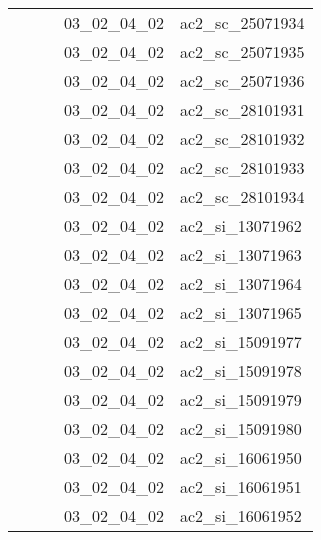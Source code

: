 \documentclass[12pt,titlepage,oneside]{book}
\begin{document}
\begin{supertabular}{|p{7.5cm}|p{7.5cm}|p{7.5cm}|c|p{10cm}|}
                   &                    &                    & 03\_02\_04\_02 & ac2\_sc\_25071934\\
                   &                    &                    & 03\_02\_04\_02 & ac2\_sc\_25071935\\
                   &                    &                    & 03\_02\_04\_02 & ac2\_sc\_25071936\\
                   &                    &                    & 03\_02\_04\_02 & ac2\_sc\_28101931\\
                   &                    &                    & 03\_02\_04\_02 & ac2\_sc\_28101932\\
                   &                    &                    & 03\_02\_04\_02 & ac2\_sc\_28101933\\
                   &                    &                    & 03\_02\_04\_02 & ac2\_sc\_28101934\\
                   &                    &                    & 03\_02\_04\_02 & ac2\_si\_13071962\\
                   &                    &                    & 03\_02\_04\_02 & ac2\_si\_13071963\\
                   &                    &                    & 03\_02\_04\_02 & ac2\_si\_13071964\\
                   &                    &                    & 03\_02\_04\_02 & ac2\_si\_13071965\\
                   &                    &                    & 03\_02\_04\_02 & ac2\_si\_15091977\\
                   &                    &                    & 03\_02\_04\_02 & ac2\_si\_15091978\\
                   &                    &                    & 03\_02\_04\_02 & ac2\_si\_15091979\\
                   &                    &                    & 03\_02\_04\_02 & ac2\_si\_15091980\\
                   &                    &                    & 03\_02\_04\_02 & ac2\_si\_16061950\\
                   &                    &                    & 03\_02\_04\_02 & ac2\_si\_16061951\\
                   &                    &                    & 03\_02\_04\_02 & ac2\_si\_16061952\\

\end{supertabular}
\end{document}
